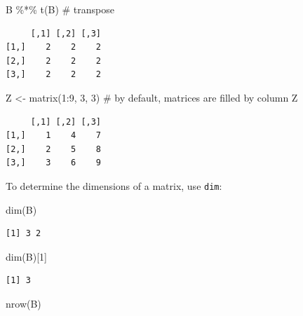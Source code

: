 \documentclass[
  letterpaper,
  DIV=11,
  numbers=noendperiod]{scrreprt}
\newenvironment{Shaded}{\begin{snugshade}}{\end{snugshade}}
\newcommand{\CommentTok}[1]{\textcolor[rgb]{0.37,0.37,0.37}{#1}}
\newcommand{\DecValTok}[1]{\textcolor[rgb]{0.68,0.00,0.00}{#1}}
\newcommand{\FunctionTok}[1]{\textcolor[rgb]{0.28,0.35,0.67}{#1}}
\newcommand{\NormalTok}[1]{\textcolor[rgb]{0.00,0.23,0.31}{#1}}
\newcommand{\OtherTok}[1]{\textcolor[rgb]{0.00,0.23,0.31}{#1}}
\newcommand{\SpecialCharTok}[1]{\textcolor[rgb]{0.37,0.37,0.37}{#1}}
\begin{document}
\begin{Shaded}
\begin{Highlighting}[]
\NormalTok{B }\SpecialCharTok{\%*\%} \FunctionTok{t}\NormalTok{(B) }\CommentTok{\# transpose}
\end{Highlighting}
\end{Shaded}

\begin{verbatim}
     [,1] [,2] [,3]
[1,]    2    2    2
[2,]    2    2    2
[3,]    2    2    2
\end{verbatim}

\begin{Shaded}
\begin{Highlighting}[]
\NormalTok{Z }\OtherTok{\textless{}{-}} \FunctionTok{matrix}\NormalTok{(}\DecValTok{1}\SpecialCharTok{:}\DecValTok{9}\NormalTok{, }\DecValTok{3}\NormalTok{, }\DecValTok{3}\NormalTok{) }\CommentTok{\# by default, matrices are filled by column}
\NormalTok{Z}
\end{Highlighting}
\end{Shaded}

\begin{verbatim}
     [,1] [,2] [,3]
[1,]    1    4    7
[2,]    2    5    8
[3,]    3    6    9
\end{verbatim}

To determine the dimensions of a matrix, use \texttt{dim}:

\begin{Shaded}
\begin{Highlighting}[]
\FunctionTok{dim}\NormalTok{(B)}
\end{Highlighting}
\end{Shaded}

\begin{verbatim}
[1] 3 2
\end{verbatim}

\begin{Shaded}
\begin{Highlighting}[]
\FunctionTok{dim}\NormalTok{(B)[}\DecValTok{1}\NormalTok{]}
\end{Highlighting}
\end{Shaded}

\begin{verbatim}
[1] 3
\end{verbatim}

\begin{Shaded}
\begin{Highlighting}[]
\FunctionTok{nrow}\NormalTok{(B) }
\end{Highlighting}
\end{Shaded}
\end{document}
